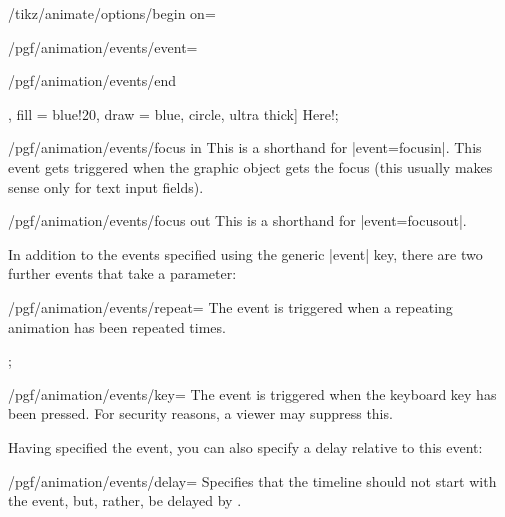 \begin{key}{/tikz/animate/options/begin on=}
\begin{key}{/pgf/animation/events/event=}
\begin{key}{/pgf/animation/events/end}
\begin{codeexample}[width=2cm]
{  },
  fill = blue!20, draw = blue, circle, ultra thick] {Here!}; 
\end{codeexample}
    \end{key}
    \begin{key}{/pgf/animation/events/focus in}
      This is a shorthand for |event=focusin|. This event gets
      triggered when the graphic object gets the focus (this usually
      makes sense only for text input fields).
    \end{key}
    \begin{key}{/pgf/animation/events/focus out}
      This is a shorthand for |event=focusout|.
    \end{key}
  \end{key}

  In addition to the events specified using the generic |event| key,
  there are two further events that take a parameter:
  \begin{key}{/pgf/animation/events/repeat=}
    The event is triggered when a repeating animation has been
    repeated  times.
\begin{codeexample}[
  animation list={
    0.333/\frac{1}{3},0.666/\frac{2}{3},1,
    1.333/1\frac{1}{3},1.666/1\frac{2}{3},2,
    2.333/2\frac{1}{3},2.666/2\frac{2}{3},3,
    3.333/2\frac{1}{3},3.666/2\frac{2}{3},4}]
\tikz 
  ; 
\end{codeexample}
  \end{key}
  
  \begin{key}{/pgf/animation/events/key=}
    The event is triggered when the keyboard key  has been
    pressed. For security reasons, a viewer may suppress this.
  \end{key}
  
  Having specified the event, you can also specify a delay relative to
  this event:

  \begin{key}{/pgf/animation/events/delay=}
    Specifies that the timeline should not start with the event, but,
    rather, be delayed by .
  \end{key}
  
\end{key}

